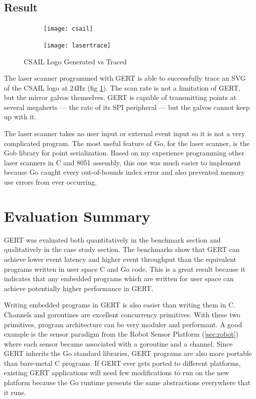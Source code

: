 \subsection{Result}
\begin{figure}[h]
  \begin{subfigure}[t!]{0.5\textwidth}
 \texttt{[image: csail]}
  \end{subfigure}
  \begin{subfigure}[t!]{0.5\textwidth}
 \texttt{[image: lasertrace]}
  \end{subfigure}
  \caption{CSAIL Logo Generated vs Traced} \label{fig:trace_v_reality}
\end{figure}
The laser scanner programmed with GERT is able to successfully trace an SVG of the CSAIL logo
at 24Hz (fig \ref{fig:trace_v_reality}). The scan rate is not a limitation of GERT, but the mirror galvos themselves. GERT is
capable of transmitting points at several megaherts --- the rate of its SPI peripheral --- but the galvos
cannot keep up with it.

The laser scanner takes no user input or external event input so it is not a very complicated program.
The most useful feature of Go, for the laser scanner, is the Gob library for point serialization.
Based on my experience programming other laser scanners in C and 8051 assembly, this one was much easier to implement because
Go caught every out-of-bounds index error and also prevented memory use errors from ever occurring.

\section{Evaluation Summary}
GERT was evaluated both quantitatively in the benchmark section and qualitatively in the case study section.
The benchmarks show that GERT can achieve lower event latency and higher event throughput than the equivalent
programs written in user space C and Go code. This is a great result because it indicates that any embedded programs
which are written for user space can achieve potentially higher performance in GERT.

Writing embedded programs in GERT is also easier than writing them in C. Channels
and goroutines are excellent concurrency primitives. With these two primitives, program architecture can be very moduler
and performant. A good example is the sensor paradigm from the Robot Sensor Platform (\ref{sec:robot}) where each
sensor became associated with a goroutine and a channel. Since GERT inherits the Go standard libraries, GERT programs
are also more portable than bare-metal C programs. If GERT ever gets ported to different platforms, existing GERT applications
will need few modifications to run on the new platform because the Go runtime presents the same abstractions everywhere
that it runs.

